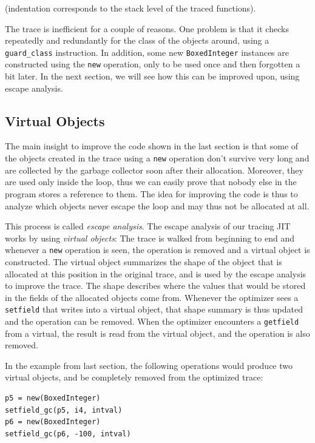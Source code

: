 \documentclass{sigplanconf}
\begin{document}
(indentation corresponds to the stack level of the traced functions).

The trace is inefficient for a couple of reasons. One problem is that it checks
repeatedly and redundantly for the class of the objects around, using a
\texttt{guard\_class} instruction. In addition, some new \texttt{BoxedInteger} instances are
constructed using the \texttt{new} operation, only to be used once and then forgotten
a bit later. In the next section, we will see how this can be improved upon,
using escape analysis.

\subsection{Virtual Objects}

The main insight to improve the code shown in the last section is that some of
the objects created in the trace using a \texttt{new} operation don't survive very
long and are collected by the garbage collector soon after their allocation.
Moreover, they are used only inside the loop, thus we can easily prove that
nobody else in the program stores a reference to them. The
idea for improving the code is thus to analyze which objects never escape the
loop and may thus not be allocated at all.

This process is called \emph{escape analysis}. The escape analysis of
our tracing JIT works by using \emph{virtual objects}: The trace is walked from
beginning to end and whenever a \texttt{new} operation is seen, the operation is
removed and a virtual object is constructed. The virtual object summarizes the
shape of the object that is allocated at this position in the original trace,
and is used by the escape analysis to improve the trace. The shape describes
where the values that would be stored in the fields of the allocated objects
come from. Whenever the optimizer sees a \texttt{setfield} that writes into a virtual
object, that shape summary is thus updated and the operation can be removed.
When the optimizer encounters a \texttt{getfield} from a virtual, the result is read
from the virtual object, and the operation is also removed.

In the example from last section, the following operations would produce two
virtual objects, and be completely removed from the optimized trace:

\begin{verbatim}
p5 = new(BoxedInteger)
setfield_gc(p5, i4, intval)
p6 = new(BoxedInteger)
setfield_gc(p6, -100, intval)
\end{verbatim}
\end{document}

